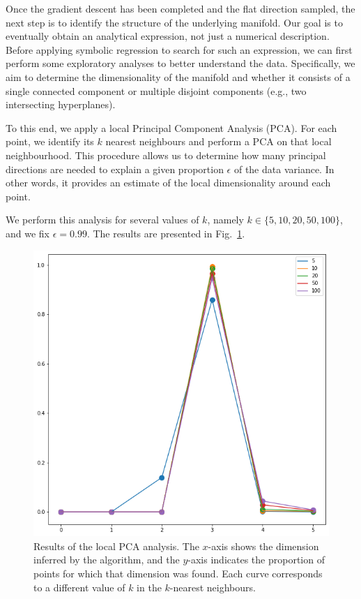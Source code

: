 \documentclass[11pt]{article}
\begin{document}
		Once the gradient descent has been completed and the flat direction sampled, the next step is to identify the structure of the underlying manifold. Our goal is to eventually obtain an analytical expression, not just a numerical description. Before applying symbolic regression to search for such an expression, we can first perform some exploratory analyses to better understand the data. Specifically, we aim to determine the dimensionality of the manifold and whether it consists of a single connected component or multiple disjoint components (e.g., two intersecting hyperplanes).
		
		To this end, we apply a local Principal Component Analysis (PCA). For each point, we identify its $k$ nearest neighbours and perform a PCA on that local neighbourhood. This procedure allows us to determine how many principal directions are needed to explain a given proportion $\epsilon$ of the data variance. In other words, it provides an estimate of the local dimensionality around each point.
		
		We perform this analysis for several values of $k$, namely $k \in \{5, 10, 20, 50, 100\}$, and we fix $\epsilon = 0.99$. The results are presented in Fig. \ref{local_pca}.
		
		\begin{figure}
			\centering
			\includegraphics[scale=0.5]{Figures/Local_PCA.png}
			\caption{Results of the local PCA analysis. The $x$-axis shows the dimension inferred by the algorithm, and the $y$-axis indicates the proportion of points for which that dimension was found. Each curve corresponds to a different value of $k$ in the $k$-nearest neighbours.}
			\label{local_pca}
		\end{figure}
		
\end{document}
